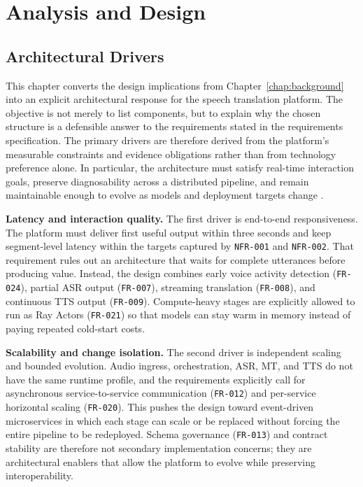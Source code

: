 \chapter{Analysis and Design}
\label{chap:analysis_design}

\section{Architectural Drivers}
\label{sec:arch_drivers}

This chapter converts the design implications from Chapter~\ref{chap:background} into an explicit architectural response for the speech translation platform. The objective is not merely to list components, but to explain why the chosen structure is a defensible answer to the requirements stated in the requirements specification. The primary drivers are therefore derived from the platform's measurable constraints and evidence obligations rather than from technology preference alone. In particular, the architecture must satisfy real-time interaction goals, preserve diagnosability across a distributed pipeline, and remain maintainable enough to evolve as models and deployment targets change \cite{kleppmann2017designing,richardson2018microservices,bass2021softwarearchitectureinpractice}.

\textbf{Latency and interaction quality.} The first driver is end-to-end responsiveness. The platform must deliver first useful output within three seconds and keep segment-level latency within the targets captured by \texttt{NFR-001} and \texttt{NFR-002}. That requirement rules out an architecture that waits for complete utterances before producing value. Instead, the design combines early voice activity detection (\texttt{FR-024}), partial ASR output (\texttt{FR-007}), streaming translation (\texttt{FR-008}), and continuous TTS output (\texttt{FR-009}). Compute-heavy stages are explicitly allowed to run as Ray Actors (\texttt{FR-021}) so that models can stay warm in memory instead of paying repeated cold-start costs.

\textbf{Scalability and change isolation.} The second driver is independent scaling and bounded evolution. Audio ingress, orchestration, ASR, MT, and TTS do not have the same runtime profile, and the requirements explicitly call for asynchronous service-to-service communication (\texttt{FR-012}) and per-service horizontal scaling (\texttt{FR-020}). This pushes the design toward event-driven microservices in which each stage can scale or be replaced without forcing the entire pipeline to be redeployed. Schema governance (\texttt{FR-013}) and contract stability are therefore not secondary implementation concerns; they are architectural enablers that allow the platform to evolve while preserving interoperability.

